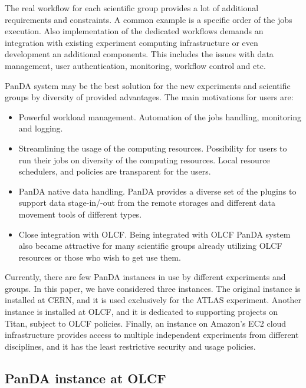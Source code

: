 The real workflow for each scientific group provides a lot of additional
requirements and constraints. A common example is a specific order of the jobs
execution. Also implementation of the dedicated workflows demands an
integration with existing experiment computing infrastructure or even
development an additional components. This includes the issues with data
management, user authentication, monitoring, workflow control and etc.

PanDA system may be the best solution for the new experiments and scientific
groups by diversity of provided advantages. The main motivations for users are:
\begin{itemize}
    \item Powerful workload management. Automation of the jobs handling,
        monitoring and logging.
    \item Streamlining the usage of the computing resources. Possibility for
        users to run their jobs on diversity of the computing resources. Local
        resource schedulers, and policies are transparent for the users.
    \item PanDA native data handling. PanDA provides a diverse set of the
        plugins to support data stage-in/-out from the remote storages and
        different data movement tools of different types.
    \item Close integration with OLCF. Being integrated with OLCF PanDA system
        also became attractive for many scientific groups already utilizing
        OLCF resources or those who wish to get use them. 
\end{itemize}

Currently, there are few PanDA instances in use by different experiments and
groups.  In this paper, we have considered three instances. The original
instance is installed at CERN, and it is used exclusively for the ATLAS
experiment. Another instance is installed at OLCF, and it is dedicated to
supporting projects on Titan, subject to OLCF policies. Finally, an instance on
Amazon's EC2 cloud infrastructure provides access to multiple independent
experiments from different disciplines, and it has the least restrictive
security and usage policies.

\subsection{PanDA instance at OLCF}
\label{subsec:panda_instance}

